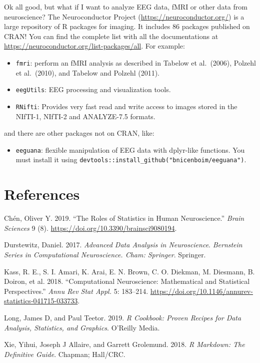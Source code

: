 \documentclass[
]{article}
\providecommand{\tightlist}{%
  \setlength{\itemsep}{0pt}\setlength{\parskip}{0pt}}
\newlength{\cslhangindent}
\newlength{\cslentryspacingunit} %
\newenvironment{CSLReferences}[2] %
 {%
  \setlength{\parindent}{0pt}
  \ifodd #1
  \let\oldpar\par
  \def\par{\hangindent=\cslhangindent\oldpar}
  \fi
  \setlength{\parskip}{#2\cslentryspacingunit}
 }%
 {}
\begin{document}
Ok all good, but what if I want to analyze EEG data, fMRI or other data
from neuroscience? The Neuroconductor Project
(\url{https://neuroconductor.org/}) is a large repository of R packages
for imaging. It includes 86 packages published on CRAN! You can find the
complete list with all the documentations at
\url{https://neuroconductor.org/list-packages/all}. For example:

\begin{itemize}
\tightlist
\item
  \texttt{fmri}: perform an fMRI analysis as described in Tabelow et
  al.~(2006), Polzehl et al.~(2010), and Tabelow and Polzehl (2011).
\item
  \texttt{eegUtils}: EEG processing and visualization tools.
\item
  \texttt{RNifti}: Provides very fast read and write access to images
  stored in the NIfTI-1, NIfTI-2 and ANALYZE-7.5 formats.
\end{itemize}

and there are other packages not on CRAN, like:

\begin{itemize}
\tightlist
\item
  \texttt{eeguana}: flexible manipulation of EEG data with dplyr-like
  functions. You must install it using
  \texttt{devtools::install\_github("bnicenboim/eeguana")}.
\end{itemize}

\hypertarget{references}{%
\section*{References}\label{references}}

\hypertarget{refs}{}
\begin{CSLReferences}{1}{0}
\leavevmode{}%
Chén, Oliver Y. 2019. {``The Roles of Statistics in Human
Neuroscience.''} \emph{Brain Sciences} 9 (8).
\url{https://doi.org/10.3390/brainsci9080194}.

\leavevmode{}%
Durstewitz, Daniel. 2017. \emph{Advanced Data Analysis in Neuroscience}.
\emph{Bernstein Series in Computational Neuroscience. Cham: Springer}.
Springer.

\leavevmode{}%
Kass, R. E., S. I. Amari, K. Arai, E. N. Brown, C. O. Diekman, M.
Diesmann, B. Doiron, et al. 2018. {``Computational Neuroscience:
Mathematical and Statistical Perspectives.''} \emph{Annu Rev Stat Appl.}
5: 183--214.
\url{https://doi.org/10.1146/annurev-statistics-041715-033733}.

\leavevmode{}%
Long, James D, and Paul Teetor. 2019. \emph{R Cookbook: Proven Recipes
for Data Analysis, Statistics, and Graphics}. O'Reilly Media.

\leavevmode{}%
Xie, Yihui, Joseph J Allaire, and Garrett Grolemund. 2018. \emph{R
Markdown: The Definitive Guide}. Chapman; Hall/CRC.

\end{CSLReferences}
\end{document}
